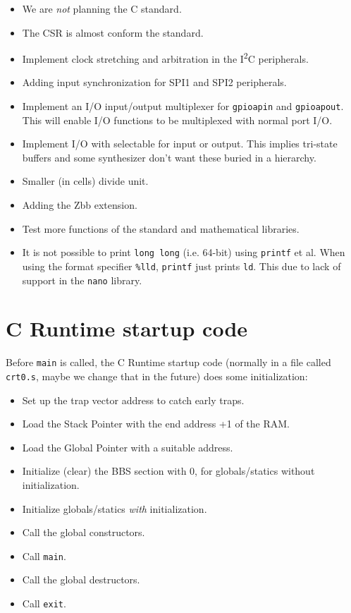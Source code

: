\documentclass[12pt]{article}
\begin{document}
\begin{itemize}
\item We are \emph{not} planning the C standard.
\item The CSR is almost conform the standard.
\item Implement clock stretching and arbitration in the I\textsuperscript{2}C peripherals.
\item Adding input synchronization for SPI1 and SPI2 peripherals.
\item Implement an I/O input/output multiplexer for \lstinline|gpioapin| and \lstinline|gpioapout|. This will enable I/O functions to be multiplexed with normal port I/O.
\item Implement I/O with selectable for input or output. This implies tri-state buffers and some synthesizer don't want these buried in a hierarchy.
\item Smaller (in cells) divide unit.
\item Adding the Zbb extension.
\item Test more functions of the standard and mathematical libraries.
\item It is not possible to print \lstinline|long long| (i.e. 64-bit) using \lstinline|printf| et al. When using the format specifier \lstinline|%lld|, \lstinline|printf| just prints \lstinline|ld|. This due to lack of support in the \lstinline|nano| library.

\end{itemize}

\appendix
\section{C Runtime startup code}
Before \lstinline|main| is called, the C Runtime startup code (normally in a file called \lstinline|crt0.s|, maybe we change that in the future) does some initialization:

\begin{itemize}
\item Set up the trap vector address to catch early traps.
\item Load the Stack Pointer with the end address +1 of the RAM.
\item Load the Global Pointer with a suitable address.
\item Initialize (clear) the BBS section with 0, for globals/statics without initialization.
\item Initialize globals/statics \emph{with} initialization.
\item Call the global constructors.
\item Call \lstinline|main|.
\item Call the global destructors.
\item Call \lstinline|exit|.
\end{itemize} 
\end{document}
